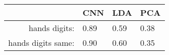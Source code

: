 \begin{tabular}{|r|l|l|l|}
  \hline
    & CNN & LDA & PCA \\
  \hline
  hands digits: & 0.89 & 0.59 & 0.38 \\
  \hline
  hands digits same: & 0.90 & 0.60 & 0.35 \\
  \hline
\end{tabular}
